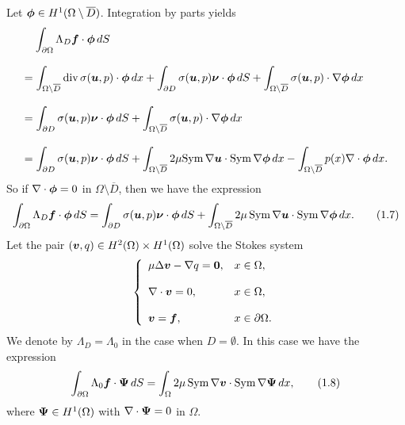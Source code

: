 Let $\mbox{\boldmath $\phi$}\in H^{1}(\Omega\setminus\overline{D})$.
Integration by parts yields
$$\begin{array}{l}
\displaystyle
\,\,\,\,\,\,
\int_{\partial\Omega}\Lambda_D\mbox{\boldmath $f$}\cdot\mbox{\boldmath $\phi$}\,dS
\\
\\
\displaystyle
=\int_{\Omega\setminus\overline{D}}
\text{div}\,\sigma(\mbox{\boldmath $u$},p)\cdot\mbox{\boldmath $\phi$}\,dx
+\int_{\partial D}\sigma(\mbox{\boldmath $u$},p)\mbox{\boldmath $\nu$}\cdot\mbox{\boldmath $\phi$}\,dS
+\int_{\Omega\setminus\overline{D}}\sigma(\mbox{\boldmath $u$},p)\cdot\nabla\mbox{\boldmath $\phi$}\,dx
\\
\\
\displaystyle
=\int_{\partial D}\sigma(\mbox{\boldmath $u$},p)\mbox{\boldmath $\nu$}\cdot\mbox{\boldmath $\phi$}\,dS+\int_{\Omega\setminus\overline{D}}\sigma(\mbox{\boldmath $u$},p)\cdot\nabla\mbox{\boldmath $\phi$}\,dx\\
\\
\displaystyle
=\int_{\partial D}\sigma(\mbox{\boldmath $u$},p)\mbox{\boldmath $\nu$}\cdot\mbox{\boldmath $\phi$}\,dS+\int_{\Omega\setminus\overline{D}}2\mu\text{Sym}\,\nabla\mbox{\boldmath $u$}\cdot
\text{Sym}\,\nabla\mbox{\boldmath $\phi$}\,dx
-\int_{\Omega\setminus\overline{D}}p(x)\nabla\cdot\mbox{\boldmath $\phi$}\,dx.
\end{array}
$$
So if $\nabla\cdot\mbox{\boldmath $\phi$}=0$ in $\Omega\setminus\overline{D}$, then we have the expression
$$\displaystyle
\int_{\partial\Omega}\Lambda_D\mbox{\boldmath $f$}\cdot\mbox{\boldmath $\phi$}\,dS
=\int_{\partial D}\sigma(\mbox{\boldmath $u$},p)\mbox{\boldmath $\nu$}\cdot\mbox{\boldmath $\phi$}\,dS+\int_{\Omega\setminus\overline{D}}2\mu\,\text{Sym}\,\nabla\mbox{\boldmath $u$}\cdot
\text{Sym}\,\nabla\mbox{\boldmath $\phi$}\,dx.
\tag {1.7}
$$
Let the pair $(\mbox{\boldmath $v$},q)\in H^2(\Omega)\times H^1(\Omega)$ solve the Stokes system 
$$\left\{
 \begin{array}{ll}
 \mu\Delta\mbox{\boldmath $v$}-\nabla q=\mbox{\boldmath $0$}, & x\in\Omega,
 \\
 \\
 \displaystyle
 \nabla\cdot\mbox{\boldmath $v$}=0, & x\in\Omega,
 \\
 \\
 \displaystyle
 \mbox{\boldmath $v$}=\mbox{\boldmath $f$}, & x\in\partial\Omega.
 \end{array}
 \right.
 $$
We  denote by $\Lambda_D=\Lambda_0$ in the case when $D=\emptyset$.
In this case we have the expression
$$\displaystyle
\int_{\partial\Omega}\Lambda_0\mbox{\boldmath $f$}\cdot\mbox{\boldmath $\Psi$}\,dS
=\int_{\Omega}2\mu\,\text{Sym}\,\nabla\mbox{\boldmath $v$}\cdot
\text{Sym}\,\nabla\mbox{\boldmath $\Psi$}\,dx,
\tag {1.8}
$$
where $\mbox{\boldmath $\Psi$}\in H^1(\Omega)$ with $\nabla\cdot\mbox{\boldmath $\Psi$}=0$ in $\Omega$.

